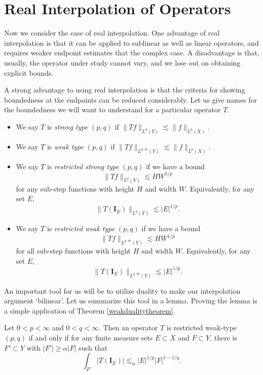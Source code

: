 \section{Real Interpolation of Operators}

Now we consider the case of real interpolation. One advantage of real interpolation is that it can be applied to sublinear as well as linear operators, and requires weaker endpoint estimates that the complex case. A disadvantage is that, usually, the operator under study cannot vary, and we lose out on obtaining explicit bounds.

A strong advantage to using real interpolation is that the criteria for showing boundedness at the endpoints can be reduced considerably. Let us give names for the boundedness we will want to understand for a particular operator $T$.
%
\begin{itemize}
  \item We say $T$ is \emph{strong type} $(p,q)$ if $\| Tf \|_{L^q(Y)} \lesssim \| f \|_{L^p(X)}$.
  
  \item We say $T$ is \emph{weak type} $(p,q)$ if $\| Tf \|_{L^{q,\infty}(Y)} \lesssim \| f \|_{L^p(X)}$.

  \item We say $T$ is \emph{restricted strong type} $(p,q)$ if we have a bound
  \[ \| Tf \|_{L^q(Y)} \lesssim HW^{1/p} \]
  for any sub-step functions with height $H$ and width $W$. Equivalently, for any set $E$,
  \[ \| T(\mathbf{I}_E) \|_{L^q(Y)} \lesssim |E|^{1/p}. \]

  \item We say $T$ is \emph{restricted weak type} $(p,q)$ if we have a bound
  \[ \| Tf \|_{L^{q,\infty}(Y)} \lesssim HW^{1/p} \]
  for all sub-step functions with height $H$ and width $W$. Equivalently, for any set $E$,
  \[ \| T(\mathbf{I}_E) \|_{L^{q,\infty}(Y)} \lesssim |E|^{1/p}. \]
\end{itemize}
%
An important tool for us will be to utilize duality to make our interpolation argument `bilinear'. Let us summarize this tool in a lemma. Proving the lemma is a simple application of Theorem \ref{weakdualitytheorem}.

\begin{lemma}
  Let $0 < p < \infty$ and $0 < q < \infty$. Then an operator $T$ is restricted weak-type $(p,q)$ if and only if for any finite measure sets $E \subset X$ and $F \subset Y$, there is $F' \subset Y$ with $|F'| \geq \alpha |F|$ such that
  \[ \int_{F'} |T(\mathbf{I}_E)| \lesssim_\alpha |E|^{1/p} |F|^{1-1/q}. \]
\end{lemma}


